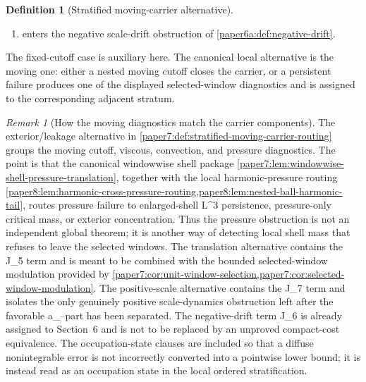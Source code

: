 \documentclass[11pt]{amsart}
\def\({}%
\def\){}%
\def\tau{tau}%
\def\infty{infty}%
\theoremstyle{plain}
\theoremstyle{definition}
\newtheorem{definition}[definition]{Definition}
\theoremstyle{remark}
\newtheorem{remark}[remark]{Remark}
\begin{document}
\begin{definition}[Stratified moving-carrier alternative]
\begin{enumerate}[label=\textup{(\roman*)}]
\(\tau_n\in I_n\), radii \(R_n\to\infty\), cutoffs
\(\Phi_n(y)=\phi(y/R_n)\), and \(\eta>0\) such that
\[
  \sup_n\bigl(|a(\tau_n)|+\|b(\tau_n)\|_\infty\bigr)<\infty,
\]
\[
  a_+(\tau_n)\int |V(y,\tau_n)|^2
  \bigl(-y\cdot\nabla\Phi_n(y)\bigr)\,dy\ge\eta
\]
for every \(n\), and this persistent positive scale forcing is assigned to the
already named scale-rigid residual alternative or to a bounded selected-window
limit refinement of that alternative; or the normalized positive-scale-work
carrier blocks have a retained compact occupation-state limit whose compact-core
realization satisfies the scale-rigid branch clauses of
\cref{paper3:def:scale-rigid-branch}.  If the occupation state instead has an
earlier exterior/leakage, modulation-driven recentering, or negative-drift
label, the branch is read in that earlier alternative rather than in the
positive-scale alternative.
\item \(\omega\) enters the negative scale-drift obstruction of
\cref{paper6a:def:negative-drift}.
\end{enumerate}
The fixed-cutoff case is auxiliary here.  The canonical local alternative is the
moving one: either a nested moving cutoff closes the carrier, or a persistent
failure produces one of the displayed selected-window diagnostics and is assigned
to the corresponding adjacent stratum.
\end{definition}

\begin{remark}[How the moving diagnostics match the carrier components]
\label{paper7:rem:stratified-moving-routing}
The exterior/leakage alternative in
\cref{paper7:def:stratified-moving-carrier-routing} groups the moving cutoff,
viscous, convection, and pressure diagnostics.  The point is that the canonical
windowwise shell package
\cref{paper7:lem:windowwise-shell-pressure-translation}, together with the
local harmonic-pressure routing
\cref{paper8:lem:harmonic-cross-pressure-routing,paper8:lem:nested-ball-harmonic-tail},
routes pressure failure to enlarged-shell \(L^3\) persistence, pressure-only
critical mass, or exterior concentration.  Thus the pressure obstruction is
not an independent global theorem; it is another way of detecting local shell
mass that refuses to leave the selected windows.  The
translation alternative contains the \(J_5\) term and is meant to be combined
with the bounded selected-window modulation provided by
\cref{paper7:cor:unit-window-selection,paper7:cor:selected-window-modulation}.
The positive-scale alternative contains the \(J_7\) term and isolates the only
genuinely positive scale-dynamics obstruction left after the favorable
\(a_-\)-part has been separated.  The negative-drift term \(J_6\) is already
assigned to Section~6 and is not to be replaced by an unproved compact-cost
equivalence.  The occupation-state clauses are included so that a diffuse
nonintegrable error is not incorrectly converted into a pointwise lower bound;
it is instead read as an occupation state in the local ordered stratification.
\end{remark}
\end{document}
